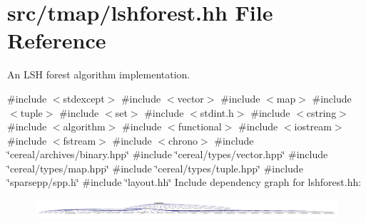 \hypertarget{lshforest_8hh}{}\section{src/tmap/lshforest.hh File Reference}
\label{lshforest_8hh}


An L\+SH forest algorithm implementation.  


{\ttfamily \#include $<$stdexcept$>$}\newline
{\ttfamily \#include $<$vector$>$}\newline
{\ttfamily \#include $<$map$>$}\newline
{\ttfamily \#include $<$tuple$>$}\newline
{\ttfamily \#include $<$set$>$}\newline
{\ttfamily \#include $<$stdint.\+h$>$}\newline
{\ttfamily \#include $<$cstring$>$}\newline
{\ttfamily \#include $<$algorithm$>$}\newline
{\ttfamily \#include $<$functional$>$}\newline
{\ttfamily \#include $<$iostream$>$}\newline
{\ttfamily \#include $<$fstream$>$}\newline
{\ttfamily \#include $<$chrono$>$}\newline
{\ttfamily \#include \char`\"{}cereal/archives/binary.\+hpp\char`\"{}}\newline
{\ttfamily \#include \char`\"{}cereal/types/vector.\+hpp\char`\"{}}\newline
{\ttfamily \#include \char`\"{}cereal/types/map.\+hpp\char`\"{}}\newline
{\ttfamily \#include \char`\"{}cereal/types/tuple.\+hpp\char`\"{}}\newline
{\ttfamily \#include \char`\"{}sparsepp/spp.\+h\char`\"{}}\newline
{\ttfamily \#include \char`\"{}layout.\+hh\char`\"{}}\newline
Include dependency graph for lshforest.\+hh\+:\nopagebreak
\begin{figure}[H]
\begin{center}
\leavevmode
\includegraphics[width=350pt]{lshforest_8hh__incl}
\end{center}
\end{figure}
